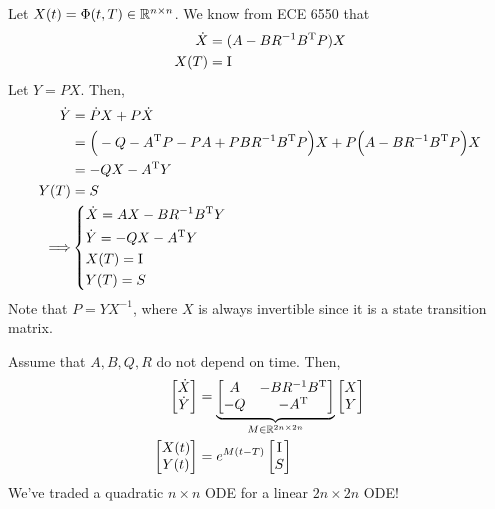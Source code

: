 Let $X(t)=\Phi(t,T)\in\mathbb{R}^{n\times n}$. We know from ECE 6550 that
\begin{align}
  \dot X &= (A-BR^{-1}B^\text{T} P) X \\
  X(T) &= \mathrm{I}
\end{align}
Let $Y=PX$. Then,
\begin{align}
  \dot Y &= \dot P X + P \dot X \\
         &= \Big( -Q - A^\text{T} P - PA + PBR^{-1}B^\text{T} P \Big) X + P \Big( A - BR^{-1}B^\text{T} P \Big) X \\
         &= -Q X - A^\text{T} Y \\
  Y(T) &= S \\
  \Longrightarrow &
  \begin{dcases}
    \dot X = AX - BR^{-1}B^\text{T} Y \\
    \dot Y = -QX - A^\text{T} Y \\
    X(T) = \mathrm{I} \\
    Y(T) = S
  \end{dcases}
\end{align}
Note that $P=YX^{-1}$, where $X$ is always invertible since it is a state transition matrix.

Assume that $A,B,Q,R$ do not depend on time. Then,
\begin{align}
  \begin{bmatrix}
    \dot X \\ \dot Y
  \end{bmatrix} &= \underbrace{ \begin{bmatrix}
    A & -BR^{-1}B^\text{T} \\ -Q & -A^\text{T}
  \end{bmatrix} }_{M\in\mathbb{R}^{2n\times 2n}} \begin{bmatrix}
    X \\ Y
  \end{bmatrix} \label{eq:dre_1} \\
  \begin{bmatrix}
    X(t) \\ Y(t)
  \end{bmatrix} &= e^{M(t-T)} \begin{bmatrix}
    \mathrm{I} \\ S
  \end{bmatrix} \label{eq:dre_2}
\end{align}
We've traded a quadratic $n\times n$ ODE for a linear $2n\times 2n$ ODE!

